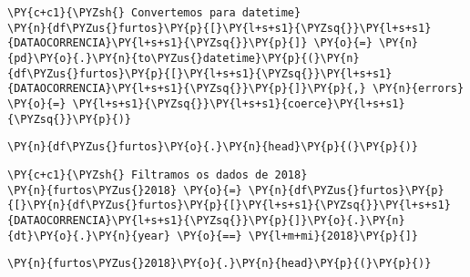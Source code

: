     \begin{tcolorbox}[breakable, size=fbox, boxrule=1pt, pad at break*=1mm,colback=cellbackground, colframe=cellborder]
\begin{Verbatim}[commandchars=\\\{\}]
\PY{c+c1}{\PYZsh{} Convertemos para datetime}
\PY{n}{df\PYZus{}furtos}\PY{p}{[}\PY{l+s+s1}{\PYZsq{}}\PY{l+s+s1}{DATAOCORRENCIA}\PY{l+s+s1}{\PYZsq{}}\PY{p}{]} \PY{o}{=} \PY{n}{pd}\PY{o}{.}\PY{n}{to\PYZus{}datetime}\PY{p}{(}\PY{n}{df\PYZus{}furtos}\PY{p}{[}\PY{l+s+s1}{\PYZsq{}}\PY{l+s+s1}{DATAOCORRENCIA}\PY{l+s+s1}{\PYZsq{}}\PY{p}{]}\PY{p}{,} \PY{n}{errors} \PY{o}{=} \PY{l+s+s1}{\PYZsq{}}\PY{l+s+s1}{coerce}\PY{l+s+s1}{\PYZsq{}}\PY{p}{)}
\end{Verbatim}
\end{tcolorbox}

    \begin{tcolorbox}[breakable, size=fbox, boxrule=1pt, pad at break*=1mm,colback=cellbackground, colframe=cellborder]
\begin{Verbatim}[commandchars=\\\{\}]
\PY{n}{df\PYZus{}furtos}\PY{o}{.}\PY{n}{head}\PY{p}{(}\PY{p}{)}
\end{Verbatim}
\end{tcolorbox}

    \begin{tcolorbox}[breakable, size=fbox, boxrule=1pt, pad at break*=1mm,colback=cellbackground, colframe=cellborder]
\begin{Verbatim}[commandchars=\\\{\}]
\PY{c+c1}{\PYZsh{} Filtramos os dados de 2018}
\PY{n}{furtos\PYZus{}2018} \PY{o}{=} \PY{n}{df\PYZus{}furtos}\PY{p}{[}\PY{n}{df\PYZus{}furtos}\PY{p}{[}\PY{l+s+s1}{\PYZsq{}}\PY{l+s+s1}{DATAOCORRENCIA}\PY{l+s+s1}{\PYZsq{}}\PY{p}{]}\PY{o}{.}\PY{n}{dt}\PY{o}{.}\PY{n}{year} \PY{o}{==} \PY{l+m+mi}{2018}\PY{p}{]}
\end{Verbatim}
\end{tcolorbox}

    \begin{tcolorbox}[breakable, size=fbox, boxrule=1pt, pad at break*=1mm,colback=cellbackground, colframe=cellborder]
\begin{Verbatim}[commandchars=\\\{\}]
\PY{n}{furtos\PYZus{}2018}\PY{o}{.}\PY{n}{head}\PY{p}{(}\PY{p}{)}
\end{Verbatim}
\end{tcolorbox}

